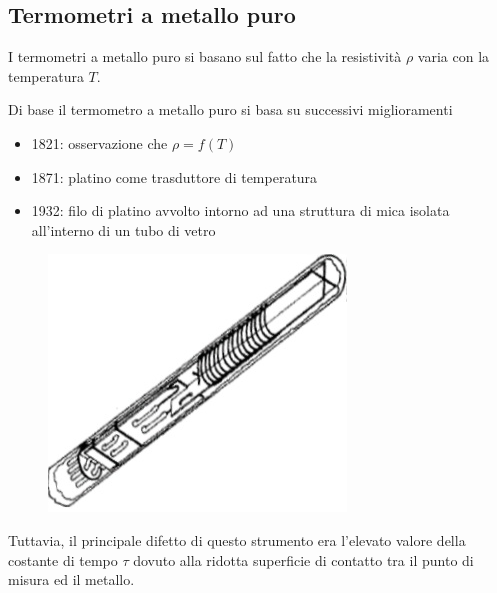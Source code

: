 \documentclass[a4paper, 15pt]{article}
\begin{document}
\subsection{Termometri a metallo puro}
\begin{adjustwidth}{2in}{} 
	I termometri a metallo puro si basano sul fatto che la resistività $\rho$ varia con la temperatura $T$. 
	
	Di base il termometro a metallo puro si basa su successivi miglioramenti
	\begin{itemize}
		\item 1821: osservazione che \(\rho = f(T)\)
		\item 1871: platino come trasduttore di temperatura
		\item 1932: filo di platino avvolto intorno ad una struttura di mica isolata all'interno di un tubo di vetro
	\end{itemize}
	\begin{figure}[H]
		\centering
		\includegraphics[width=0.3\linewidth]{immagini/Inkedscreenshot005}
		\label{fig:screenshot005}
	\end{figure}	
	Tuttavia, il principale difetto di questo strumento era l'elevato valore della costante di tempo $\tau$ dovuto alla ridotta superficie di contatto tra il punto di misura ed il metallo.
	

\end{adjustwidth}
\end{document}
